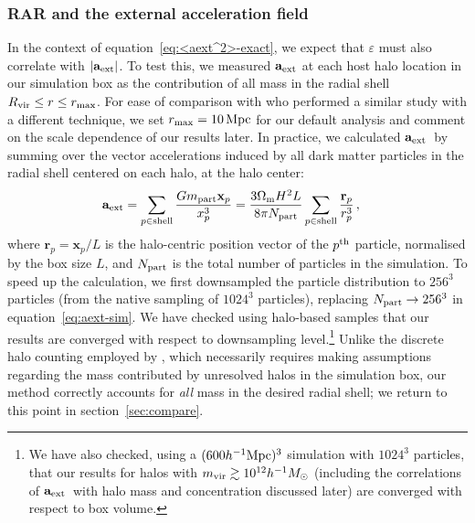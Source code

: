 \documentclass[usenatbib]{mnras}
\newcommand{\aext}{\ensuremath{\mathbf{a}_{\rm ext}}}
\newcommand{\Mh}{\ensuremath{h^{-1}M_{\odot}}}
\newcommand{\Mpch}{\ensuremath{h^{-1}{\rm Mpc}}}
\newcommand{\eqn}[1]{equation~\eqref{#1}}
\begin{document}
\subsubsection{RAR and the external acceleration field}
In the context of \eqn{eq:<aext^2>-exact}, we  expect that $\varepsilon$ must also correlate with $|\aext|$. To test this, we measured $\aext$ at each host halo location in our simulation box as the contribution of all mass in the radial shell $R_{\rm vir}\leq r\leq r_{\rm max}$. For ease of comparison with \citet[][hereafter, D18]{dflj18} who performed a similar study with a different technique, we set $r_{\rm max}=10\,{\rm Mpc}$ for our default analysis and comment on the scale dependence of our results later. 
In practice, we calculated \aext\ by summing over the vector accelerations induced by all dark matter particles in the radial shell centered on each halo, at the halo center:
\begin{align}
\aext &= \sum_{p\in{\rm shell}} \frac{Gm_{\rm part}\mathbf{x}_p}{x_p^3} = \frac{3\Omega_{\rm m}H^2L}{8\pi N_{\rm part}}\sum_{p\in{\rm shell}}\frac{\mathbf{r}_p}{r_p^3}\,,
\label{eq:aext-sim}
\end{align}
%
where $\mathbf{r}_p = \mathbf{x}_p/L$ is the halo-centric position vector of the $p^{\rm th}$ particle, normalised by the box size $L$, and $N_{\rm part}$ is the total number of particles in the simulation. To speed up the calculation, we first downsampled the particle distribution to $256^3$ particles (from the native sampling of $1024^3$ particles), replacing $N_{\rm part}\to256^3$ in \eqn{eq:aext-sim}. We have checked using halo-based samples that our results are converged with respect to downsampling level.\footnote{We have also checked, using a $(600\Mpch)^3$ simulation with $1024^3$ particles, that our results for halos with $m_{\rm vir}\gtrsim10^{12}\Mh$ (including the correlations of \aext\ with halo mass and concentration discussed later) are converged with respect to box volume.}
Unlike the discrete halo counting employed by , which necessarily requires making assumptions regarding the mass contributed by unresolved halos in the simulation box, our method correctly accounts for \emph{all} mass in the desired radial shell; we return to this point in section~\ref{sec:compare}. 
\end{document}
